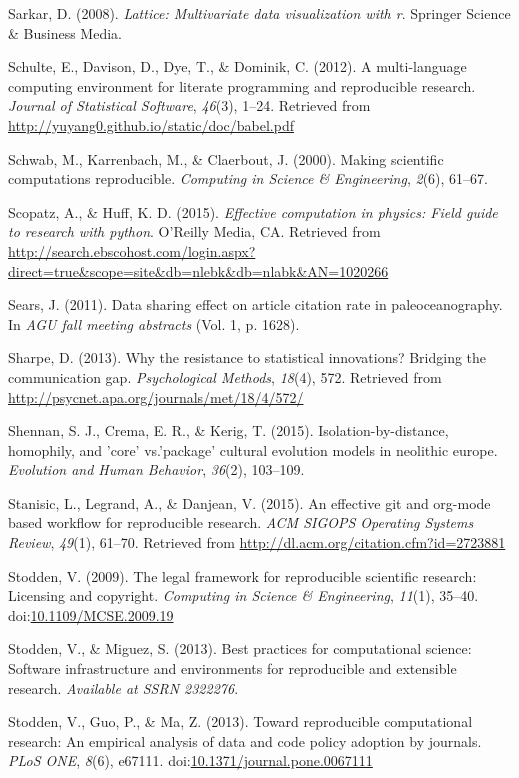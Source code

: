 \documentclass[american,man]{apa6}
\begin{document}
Sarkar, D. (2008). \emph{Lattice: Multivariate data visualization with
r}. Springer Science \& Business Media.

Schulte, E., Davison, D., Dye, T., \& Dominik, C. (2012). A
multi-language computing environment for literate programming and
reproducible research. \emph{Journal of Statistical Software},
\emph{46}(3), 1--24. Retrieved from
\url{http://yuyang0.github.io/static/doc/babel.pdf}

Schwab, M., Karrenbach, M., \& Claerbout, J. (2000). Making scientific
computations reproducible. \emph{Computing in Science \& Engineering},
\emph{2}(6), 61--67.

Scopatz, A., \& Huff, K. D. (2015). \emph{Effective computation in
physics: Field guide to research with python}. O'Reilly Media, CA.
Retrieved from
\url{http://search.ebscohost.com/login.aspx?direct=true\&scope=site\&db=nlebk\&db=nlabk\&AN=1020266}

Sears, J. (2011). Data sharing effect on article citation rate in
paleoceanography. In \emph{AGU fall meeting abstracts} (Vol. 1, p.
1628).

Sharpe, D. (2013). Why the resistance to statistical innovations?
Bridging the communication gap. \emph{Psychological Methods},
\emph{18}(4), 572. Retrieved from
\url{http://psycnet.apa.org/journals/met/18/4/572/}

Shennan, S. J., Crema, E. R., \& Kerig, T. (2015).
Isolation-by-distance, homophily, and 'core' vs.'package' cultural
evolution models in neolithic europe. \emph{Evolution and Human
Behavior}, \emph{36}(2), 103--109.

Stanisic, L., Legrand, A., \& Danjean, V. (2015). An effective git and
org-mode based workflow for reproducible research. \emph{ACM SIGOPS
Operating Systems Review}, \emph{49}(1), 61--70. Retrieved from
\url{http://dl.acm.org/citation.cfm?id=2723881}

Stodden, V. (2009). The legal framework for reproducible scientific
research: Licensing and copyright. \emph{Computing in Science \&
Engineering}, \emph{11}(1), 35--40.
doi:\href{http://dx.doi.org/10.1109/MCSE.2009.19}{10.1109/MCSE.2009.19}

Stodden, V., \& Miguez, S. (2013). Best practices for computational
science: Software infrastructure and environments for reproducible and
extensible research. \emph{Available at SSRN 2322276}.

Stodden, V., Guo, P., \& Ma, Z. (2013). Toward reproducible
computational research: An empirical analysis of data and code policy
adoption by journals. \emph{PLoS ONE}, \emph{8}(6), e67111.
doi:\href{http://dx.doi.org/10.1371/journal.pone.0067111}{10.1371/journal.pone.0067111}
\end{document}
